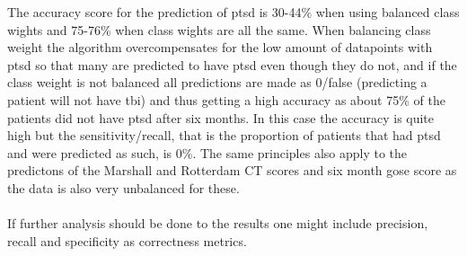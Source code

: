 \documentclass[11pt]{article}
\begin{document}
The accuracy score for the prediction of \gls{ptsd} is 30-44\% when using balanced class wights and 75-76\% when class wights are all the same. When balancing class weight the algorithm overcompensates for the low amount of datapoints with \gls{ptsd} so that many are predicted to have \gls{ptsd} even though they do not, and if the class weight is not balanced all predictions are made as 0/false (predicting a patient will not have \gls{tbi}) and thus getting a high accuracy as about 75\% of the patients did not have \gls{ptsd} after six months. In this case the accuracy is quite high but the sensitivity/recall, that is the proportion of patients that had \gls{ptsd} and were predicted as such, is 0\%. The same principles also apply to the predictons of the Marshall and Rotterdam CT scores and six month \gls{gose} score as the data is also very unbalanced for these.\\
\\
If further analysis should be done to the results one might include precision, recall and specificity as correctness metrics.
\end{document}
